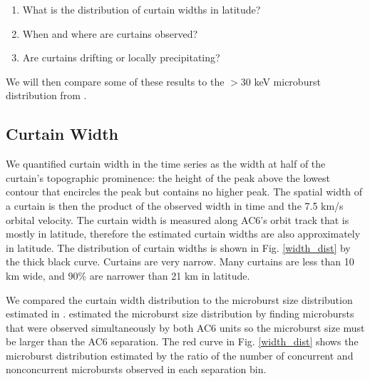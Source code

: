 \documentclass[draft]{agujournal2019}
\begin{document}
\begin{enumerate}
\item What is the distribution of curtain widths in latitude?
\item When and where are curtains observed?
\item Are curtains drifting or locally precipitating?
\end{enumerate} We will then compare some of these results to the $>30$ keV microburst distribution from .

\subsection{Curtain Width}
We quantified curtain width in the time series as the width at half of the curtain's topographic prominence: the height of the peak above the lowest contour that encircles the peak but contains no higher peak. The spatial width of a curtain is then the product of the observed width in time and the 7.5 km/s orbital velocity. The curtain width is measured along AC6's orbit track that is mostly in latitude, therefore the estimated curtain widths are also approximately in latitude. The distribution of curtain widths is shown in Fig. \ref{width_dist} by the thick black curve. Curtains are very narrow. Many curtains are less than 10 km wide, and 90\% are narrower than 21 km in latitude.
	
We compared the curtain width distribution to the microburst size distribution estimated in .  estimated the microburst size distribution by finding microbursts that were observed simultaneously by both AC6 units so the microburst size must be larger than the AC6 separation. The red curve in Fig. \ref{width_dist} shows the microburst distribution estimated by the ratio of the number of concurrent and nonconcurrent microbursts observed in each separation bin. 
\end{document}
